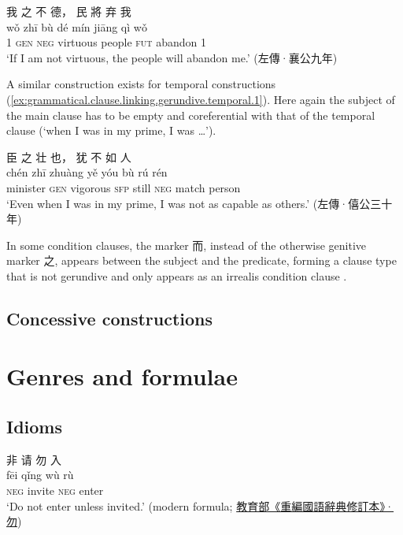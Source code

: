 \documentclass[UTF8, a4paper, oneside, scheme=plain, 12pt]{ctexrep}
\newcommand*{\citepages}[1]{pp.~{#1}}
\newcommand{\translate}[1]{`#1'}
\newcommand*{\category}[1]{\textsc{#1}}
\begin{document}
\begin{exe}
    \ex\label{ex:grammatical.clause.linking.gerundive.condition.1}
    \glll 我 之 不 德， 民 將 弃 我 \\
    wǒ zhī bù dé mín jiāng qì wǒ \\
    1 \category{gen} \category{neg} virtuous people \category{fut} abandon 1 \\
    \glt\translate{If I am not virtuous, the people will abandon me.} \hfill (左傳·襄公九年)
\end{exe}

A similar construction exists for temporal constructions (\ref{ex:grammatical.clause.linking.gerundive.temporal.1}).
Here again the subject of the main clause has to be empty and coreferential with that of the temporal clause (\translate{when I was in my prime, I was \dots}).

\begin{exe}
    \ex\label{ex:grammatical.clause.linking.gerundive.temporal.1}
    \glll 臣 之 壮 也， 犹 不 如 人 \\
    chén zhī zhuàng yě yóu bù rú rén \\
    minister \category{gen} vigorous \category{sfp} still \category{neg} match person \\
    \glt\translate{Even when I was in my prime, I was not as capable as others.} \hfill (左傳·僖公三十年)
\end{exe}

In some condition clauses,
the marker 而, instead of the otherwise genitive marker 之, appears between the subject and the predicate,
forming a clause type that is not gerundive and only appears as an irrealis condition clause
\citep[\citepages{100-102}]{meiguang2018}.


\section{Concessive constructions}

\chapter{Genres and formulae}\label{chap:formulae}

\section{Idioms}

\begin{exe}
    \ex
    \glll 非 请 勿 入 \\
    fēi qǐng wù rù \\
    \category{neg} invite \category{neg} enter \\
    \glt\translate{Do not enter unless invited.} \hfill (modern formula; \href{https://pedia.cloud.edu.tw/Entry/Detail?title=%E5%8B%BF}{教育部《重編國語辭典修訂本》·勿})
\end{exe}
\end{document}
